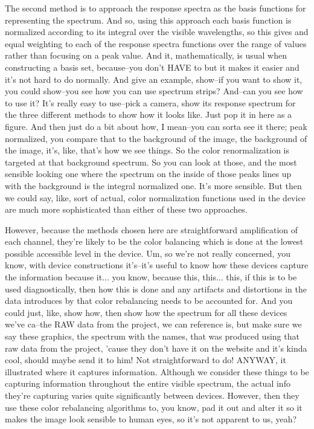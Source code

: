The second method is to approach the response spectra as the basis functions for representing the spectrum. And so, using this approach each basis function is normalized according to its integral over the visible wavelengths, so this gives and equal weighting to each of the response spectra functions over the range of values rather than focusing on a peak value. And it, mathematically, is usual when constructing a basis set, because--you don't HAVE to but it makes it easier and it's not hard to do normally. And give an example, show--if you want to show it, you could show--you see how you can use spectrum strips? And--can you see how to use it? It's really easy to use--pick a camera, show its response spectrum for the three different methods to show how it looks like. Just pop it in here as a figure. And then just do a bit about how, I mean--you can sorta see it there; peak normalized, you compare that to the background of the image, the background of the image, it's, like, that's how we see things. So the color renormalization is targeted at that background spectrum. So you can look at those, and the most sensible looking one where the spectrum on the inside of those peaks lines up with the background is the integral normalized one. It's more sensible. But then we could say, like, sort of actual, color normalization functions used in the device are much more sophisticated than either of these two approaches. 

However, because the methods chosen here are straightforward amplification of each channel, they're likely to be the color balancing which is done at the lowest possible accessible level in the device. Um, so we're not really concerned, you know, with device constructions it's--it's useful to know how these devices capture the information because it... you know, because this, this... this, if this is to be used diagnostically, then how this is done and any artifacts and distortions in the data introduces by that color rebalancing needs to be accounted for. And you could just, like, show how, then show how the spectrum for all these devices we've ca--the RAW data from the project, we can reference is, but make sure we say these graphics, the spectrum with the names, that was produced using that raw data from the project, 'cause they don't have it on the website and it's kinda cool, should maybe send it to him! Not straightforward to do! ANYWAY, it illustrated where it captures information. Although we consider these things to be capturing information throughout the entire visible spectrum, the actual info they're capturing varies quite significantly between devices. However, then they use these color rebalancing algorithms to, you know, pad it out and alter it so it makes the image look sensible to human eyes, so it's not apparent to us, yeah? 

